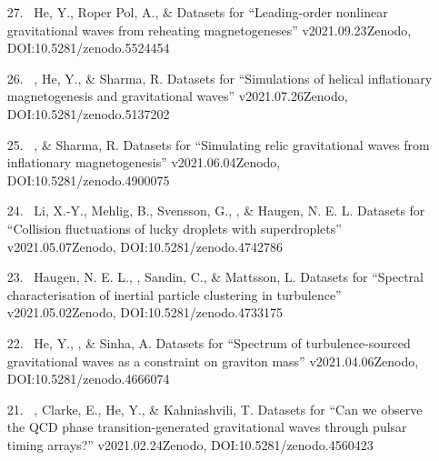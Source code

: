 \begin{itemize}
\item[{27.}~]
He, Y., Roper Pol, A., \& \Brandenburg{}
{Datasets for ``Leading-order nonlinear gravitational waves from reheating magnetogeneses'' v2021.09.23}{Zenodo, DOI:10.5281/zenodo.5524454}

\item[{26.}~]
\Brandenburg, He, Y., \& Sharma, R.
{Datasets for ``Simulations of helical inflationary magnetogenesis and gravitational waves'' v2021.07.26}{Zenodo, DOI:10.5281/zenodo.5137202}

\item[{25.}~]
\Brandenburg, \& Sharma, R.
{Datasets for ``Simulating relic gravitational waves from inflationary magnetogenesis'' v2021.06.04}{Zenodo, DOI:10.5281/zenodo.4900075}

\item[{24.}~]
Li, X.-Y., Mehlig, B., Svensson, G., \Brandenburg, \& Haugen, N. E. L.
{Datasets for ``Collision fluctuations of lucky droplets with superdroplets'' v2021.05.07}{Zenodo, DOI:10.5281/zenodo.4742786}

\item[{23.}~]
Haugen, N. E. L., \Brandenburg, Sandin, C., \& Mattsson, L.
{Datasets for ``Spectral characterisation of inertial particle clustering in turbulence'' v2021.05.02}{Zenodo, DOI:10.5281/zenodo.4733175}

\item[{22.}~]
He, Y., \Brandenburg, \& Sinha, A.
{Datasets for ``Spectrum of turbulence-sourced gravitational waves as a constraint on graviton mass'' v2021.04.06}{Zenodo, DOI:10.5281/zenodo.4666074}

\item[{21.}~]
\Brandenburg, Clarke, E., He, Y., \& Kahniashvili, T.
{Datasets for ``Can we observe the QCD phase transition-generated gravitational waves through pulsar timing arrays?'' v2021.02.24}{Zenodo, DOI:10.5281/zenodo.4560423}


\end{itemize}
